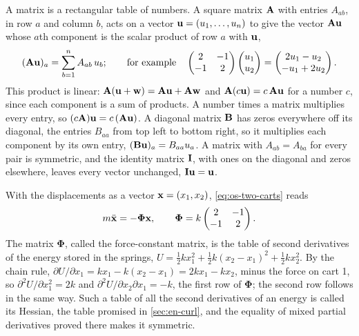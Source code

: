 \begin{toolbox}[Matrices]
A matrix is a rectangular table of numbers. A square matrix $\bm{\mathrm{A}}$
with entries $A_{ab}$, in row $a$ and column $b$, acts on a vector
$\bm{\mathrm{u}} = (u_1, \dots, u_n)$ to give the vector $\bm{\mathrm{A}}\bm{\mathrm{u}}$ whose
$a$th component is the scalar product of row $a$ with $\bm{\mathrm{u}}$,
\begin{equation*}
   (\bm{\mathrm{A}}\bm{\mathrm{u}})_a = \sum_{b=1}^{n} A_{ab}\,u_b ;
   \qquad\text{for example}\quad
   \begin{pmatrix} 2 & -1\\ -1 & 2 \end{pmatrix}
   \begin{pmatrix} u_1\\ u_2 \end{pmatrix}
   = \begin{pmatrix} 2u_1 - u_2\\ -u_1 + 2u_2 \end{pmatrix} .
\end{equation*}
This product is linear: $\bm{\mathrm{A}}(\bm{\mathrm{u}} + \bm{\mathrm{w}}) = \bm{\mathrm{A}}\bm{\mathrm{u}} +
\bm{\mathrm{A}}\bm{\mathrm{w}}$ and $\bm{\mathrm{A}}(c\bm{\mathrm{u}}) = c\,\bm{\mathrm{A}}\bm{\mathrm{u}}$ for a
number $c$, since each component is a sum of products. A number times a
matrix multiplies every entry, so $(c\bm{\mathrm{A}})\bm{\mathrm{u}} = c\,(\bm{\mathrm{A}}\bm{\mathrm{u}})$.
A diagonal matrix $\bm{\mathrm{B}}$ has zeros everywhere off its diagonal, the
entries $B_{aa}$ from top left to bottom right, so it multiplies each
component by its own entry, $(\bm{\mathrm{B}}\bm{\mathrm{u}})_a = B_{aa}u_a$. A matrix with
$A_{ab} = A_{ba}$ for every pair is symmetric, and the identity matrix
$\bm{\mathrm{I}}$, with ones on the diagonal and zeros elsewhere, leaves every
vector unchanged, $\bm{\mathrm{I}}\bm{\mathrm{u}} = \bm{\mathrm{u}}$.
\end{toolbox}

With the displacements as a vector $\bm{\mathrm{x}} = (x_1, x_2)$,
\cref{eq:os-two-carts} reads
\begin{equation*}
   m\ddot{\bm{\mathrm{x}}} = -\boldsymbol{\Phi}\bm{\mathrm{x}} , \qquad
   \boldsymbol{\Phi} = k\begin{pmatrix} 2 & -1\\ -1 & 2 \end{pmatrix} .
\end{equation*}
The matrix $\boldsymbol{\Phi}$, called the force-constant matrix, is the
table of second derivatives of the energy stored in the springs, $U =
\frac12 kx_1^2 + \frac12 k(x_2 - x_1)^2 + \frac12 kx_2^2$. By the chain
rule, $\partial U/\partial x_1 = kx_1 - k(x_2 - x_1) = 2kx_1 - kx_2$,
minus the force on cart 1, so $\partial^2U/\partial x_1^2 = 2k$ and
$\partial^2U/\partial x_2\partial x_1 = -k$, the first row of
$\boldsymbol{\Phi}$; the second row follows in the same way. Such a table
of all the second derivatives of an energy is called its Hessian, the
table promised in \cref{sec:en-curl}, and the equality of mixed partial
derivatives proved there makes it symmetric.

